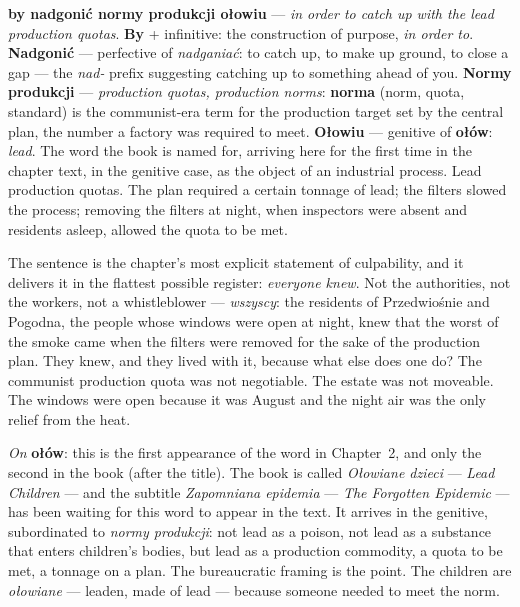 \textbf{by nadgonić normy produkcji ołowiu} ---
\textit{in order to catch up with the lead
production quotas}. \textbf{By} + infinitive:
the construction of purpose, \textit{in order to}.
\textbf{Nadgonić} --- perfective of \textit{nadganiać}:
to catch up, to make up ground, to close a gap
--- the \textit{nad-} prefix suggesting catching
up to something ahead of you. \textbf{Normy
produkcji} --- \textit{production quotas, production
norms}: \textbf{norma} (norm, quota, standard) is
the communist-era term for the production target
set by the central plan, the number a factory
was required to meet. \textbf{Ołowiu} --- genitive
of \textbf{ołów}: \textit{lead}. The word the book
is named for, arriving here for the first time
in the chapter text, in the genitive case, as the
object of an industrial process. Lead production
quotas. The plan required a certain tonnage of
lead; the filters slowed the process; removing
the filters at night, when inspectors were absent
and residents asleep, allowed the quota to be met.

\medskip
The sentence is the chapter's most explicit
statement of culpability, and it delivers it in
the flattest possible register: \textit{everyone
knew}. Not the authorities, not the workers, not
a whistleblower --- \textit{wszyscy}: the residents
of Przedwiośnie and Pogodna, the people whose
windows were open at night, knew that the worst
of the smoke came when the filters were removed
for the sake of the production plan. They knew,
and they lived with it, because what else does
one do? The communist production quota was not
negotiable. The estate was not moveable. The
windows were open because it was August and the
night air was the only relief from the heat.

\medskip
\noindent\textit{On} \textbf{ołów}: this is the
first appearance of the word in Chapter~2, and
only the second in the book (after the title).
The book is called \textit{Ołowiane dzieci} ---
\textit{Lead Children} --- and the subtitle
\textit{Zapomniana epidemia} --- \textit{The
Forgotten Epidemic} --- has been waiting for
this word to appear in the text. It arrives in
the genitive, subordinated to \textit{normy
produkcji}: not lead as a poison, not lead as
a substance that enters children's bodies, but
lead as a production commodity, a quota to be
met, a tonnage on a plan. The bureaucratic
framing is the point. The children are
\textit{ołowiane} --- leaden, made of lead ---
because someone needed to meet the norm.


